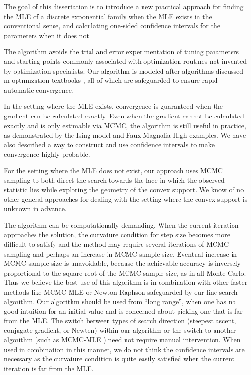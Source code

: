 The goal of this dissertation is to introduce a new practical approach
for finding the MLE of a discrete exponential family when the MLE exists
in the conventional sense,
and calculating one-sided confidence intervals for the parameters when it does not.

The algorithm avoids the trial and error experimentation of tuning parameters 
and starting points commonly associated with optimization routines
not invented by optimization specialists.  Our algorithm is modeled after algorithms 
discussed in optimization textbooks \citep{Fletcher,NW,Sun:2006},
all of which are safeguarded to ensure rapid automatic convergence.

In the setting where the MLE exists, convergence is guaranteed when the gradient 
can be calculated exactly.  Even when the 
gradient cannot be calculated 
exactly and is only estimable via MCMC, the algorithm is still useful in practice, as 
demonstrated by the Ising model and Faux Magnolia High
examples.  We have also described a way to construct and use confidence intervals to 
make convergence highly probable.

For the setting where the MLE does not exist, our approach uses MCMC sampling to
both direct the search towards the face in which the observed statistic lies
while exploring the geometry of the convex support.  
We know of no other general approaches for dealing with the setting where
the convex support is unknown in advance.

The algorithm can be computationally demanding.  When the current iteration approaches 
the solution, the 
curvature condition for step size becomes more difficult to satisfy and the method may 
require several iterations of 
MCMC sampling and perhaps an increase in MCMC sample size.  Eventual increase in MCMC 
sample size is unavoidable,
because the achievable accuracy is inversely proportional to the square root of the 
MCMC sample size, as in all Monte Carlo.
Thus we believe the best use of this algorithm is in combination with other faster 
methods like MCMC-MLE \citep{Geyer:1992}
or Newton-Raphson safeguarded by our line search algorithm.  Our 
algorithm should be used from ``long range'', when one has no good intuition for an 
initial value and is concerned about 
picking one that is far from the MLE.  The switch between types of search direction 
(steepest ascent, conjugate gradient,
or Newton) within our algorithm or the switch to another algorithm (such as MCMC-MLE 
\citep{Geyer:1992})
need not require manual intervention.  When used in combination in this
manner, we do not think the confidence intervals are necessary as the curvature 
condition is quite easily satisfied 
when the current iteration is far from the MLE.

